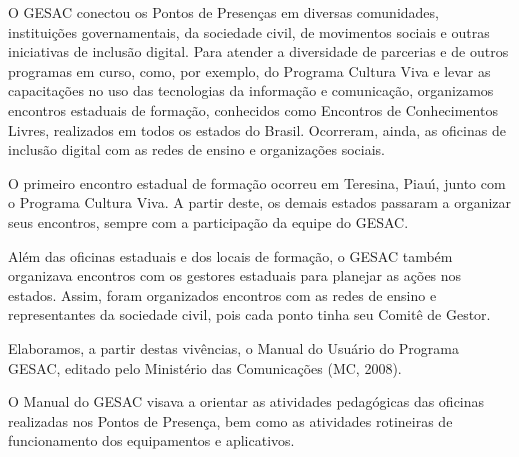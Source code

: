 \documentclass[
12pt,		%
openright,	%
twoside,  %
a4paper,			%
chapter=TITLE,		%
english,			%
french,				%
spanish,			%
brazil				%
]{USPSC-classe/USPSC}
\begin{document}
O GESAC conectou os Pontos de Presen\c{c}as em diversas comunidades, institui\c{c}\~oes governamentais, da sociedade civil, de movimentos sociais e outras iniciativas de inclus\~ao digital. Para  atender a diversidade de parcerias  e de outros programas em curso, como, por exemplo, do Programa Cultura Viva e levar as  capacita\c{c}\~oes no uso das tecnologias da informa\c{c}\~ao e comunica\c{c}\~ao, organizamos encontros estaduais de forma\c{c}\~ao, conhecidos como Encontros de Conhecimentos Livres, realizados em todos os estados do Brasil. Ocorreram, ainda, as  oficinas de inclus\~ao digital com as redes de ensino e organiza\c{c}\~oes sociais.














O primeiro encontro estadual de forma\c{c}\~ao ocorreu em  Teresina, Piau\'{\i}, junto com o Programa Cultura Viva. A partir deste, os demais estados passaram a organizar seus encontros, sempre com a participa\c{c}\~ao da equipe do GESAC.














Al\'em das oficinas estaduais e dos locais de forma\c{c}\~ao, o GESAC tamb\'em organizava encontros com os gestores estaduais para planejar as a\c{c}\~oes nos estados. Assim, foram organizados encontros com as redes de ensino e  representantes da sociedade civil, pois cada ponto  tinha seu Comit\^e de Gestor.














Elaboramos, a partir destas viv\^encias, o Manual do Usu\'ario do Programa GESAC, editado pelo Minist\'erio das Comunica\c{c}\~oes (MC, 2008).














O Manual do GESAC visava a orientar as atividades pedag\'ogicas das oficinas realizadas nos Pontos de Presen\c{c}a, bem como as  atividades rotineiras de funcionamento dos equipamentos e aplicativos.
\end{document}
